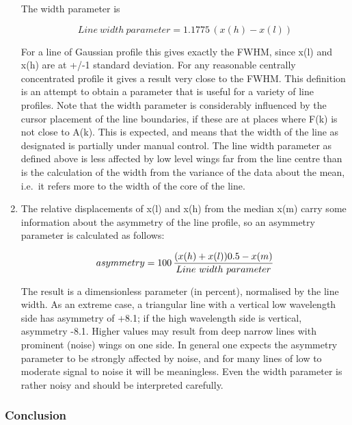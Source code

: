 \begin{enumerate}
   The width parameter is

\begin{displaymath}
   Line \ width \ parameter = 1.1775\, (x(h)-x(l))
\end{displaymath}

   For a line of Gaussian profile this gives exactly the FWHM, since
   x(l) and x(h) are at +/-1 standard deviation. For any reasonable
   centrally concentrated profile it gives a result very close to the
   FWHM. This definition is an attempt to obtain a parameter that is
   useful for a variety of line profiles. Note that the width parameter
   is considerably influenced by the cursor placement of the line
   boundaries, if these are at places where F(k) is not close to A(k).
   This is expected, and means that the width of the line as designated
   is partially under manual control. The line width parameter as
   defined above is less affected by low level wings far from the line
   centre than is the calculation of the width from the variance of the
   data about the mean, i.e.\ it refers more to the width of the core of
   the line.

\item
   The relative displacements of x(l) and x(h) from the median x(m)
   carry some information about the asymmetry of the line profile, so an
   asymmetry parameter is calculated as follows:

\begin{displaymath}
   asymmetry = 100\, {(x(h)+x(l)) 0.5 - x(m)\over
      Line \ width \ parameter}
\end{displaymath}

   The result is a dimensionless parameter (in percent), normalised by
   the line width. As an extreme case, a triangular line with a vertical
   low wavelength side has asymmetry of +8.1; if the high wavelength side
   is vertical, asymmetry -8.1. Higher values may result from deep
   narrow lines with prominent (noise) wings on one side. In general one
   expects the asymmetry parameter to be strongly affected by noise, and
   for many lines of low to moderate signal to noise it will be
   meaningless. Even the width parameter is rather noisy and should be
   interpreted carefully.
\end{enumerate}


\subsubsection{\label{techno11concl}Conclusion}

